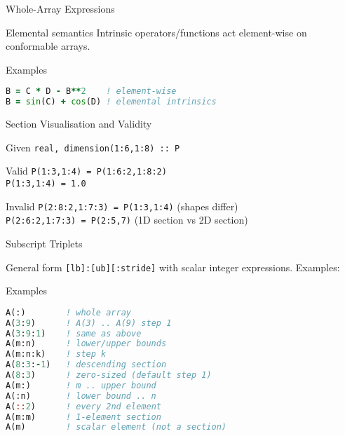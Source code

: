 \begin{frame}[fragile]{Whole-Array Expressions}
  \begin{block}{Elemental semantics}
    Intrinsic operators/functions act element-wise on conformable arrays.
  \end{block}
  \begin{block}{Examples}
\begin{lstlisting}[language=Fortran]
B = C * D - B**2    ! element-wise
B = sin(C) + cos(D) ! elemental intrinsics
\end{lstlisting}
  \end{block}
\end{frame}

\begin{frame}{Section Visualisation and Validity}
  \begin{block}{Given}
    \texttt{real, dimension(1:6,1:8) :: P}
  \end{block}
  \begin{block}{Valid}
    \texttt{P(1:3,1:4) = P(1:6:2,1:8:2)}\\
    \texttt{P(1:3,1:4) = 1.0}
  \end{block}
  \begin{block}{Invalid}
    \texttt{P(2:8:2,1:7:3) = P(1:3,1:4)} (shapes differ)\\
    \texttt{P(2:6:2,1:7:3) = P(2:5,7)} (1D section vs 2D section)
  \end{block}
\end{frame}

\begin{frame}[fragile]{Subscript Triplets}
  \begin{block}{General form}
    \texttt{[lb]:[ub][:stride]} with scalar integer expressions. Examples:
  \end{block}
  \begin{block}{Examples}
\begin{lstlisting}[language=Fortran]
A(:)        ! whole array
A(3:9)      ! A(3) .. A(9) step 1
A(3:9:1)    ! same as above
A(m:n)      ! lower/upper bounds
A(m:n:k)    ! step k
A(8:3:-1)   ! descending section
A(8:3)      ! zero-sized (default step 1)
A(m:)       ! m .. upper bound
A(:n)       ! lower bound .. n
A(::2)      ! every 2nd element
A(m:m)      ! 1-element section
A(m)        ! scalar element (not a section)
\end{lstlisting}
  \end{block}
\end{frame}

